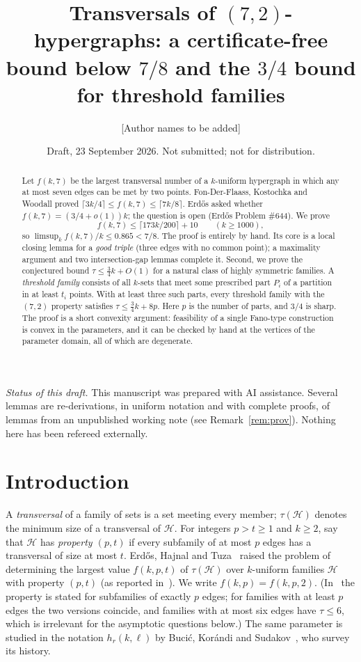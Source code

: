 \documentclass[11pt]{amsart}
\title[Transversals of $(7,2)$-hypergraphs]{Transversals of $(7,2)$-hypergraphs: a certificate-free bound below $7/8$ and the $3/4$ bound for threshold families}
\author{[Author names to be added]}
\date{Draft, 23 September 2026. Not submitted; not for distribution.}
\theoremstyle{definition}
\theoremstyle{remark}
\newcommand{\cH}{\mathcal H}
\newcommand{\ceil}[1]{\lceil #1\rceil}
\begin{document}
\begin{abstract}
Let $f(k,7)$ be the largest transversal number of a $k$-uniform hypergraph in which any at most seven edges can be met by two points. Fon-Der-Flaass, Kostochka and Woodall proved $\ceil{3k/4}\le f(k,7)\le\ceil{7k/8}$. Erd\H{o}s asked whether $f(k,7)=(3/4+o(1))k$; the question is open (Erd\H{o}s Problem \#644). We prove
\[
f(k,7)\le\ceil{173k/200}+10\qquad(k\ge1000),
\]
so $\limsup_k f(k,7)/k\le 0.865<7/8$. The proof is entirely by hand. Its core is a local closing lemma for a \emph{good triple} (three edges with no common point); a maximality argument and two intersection-gap lemmas complete it.
Second, we prove the conjectured bound $\tau\le\frac34k+O(1)$ for a natural class of highly symmetric families. A \emph{threshold family} consists of all $k$-sets that meet some prescribed part $P_i$ of a partition in at least $t_i$ points. With at least three such parts, every threshold family with the $(7,2)$ property satisfies $\tau\le\frac34k+8p$. Here $p$ is the number of parts, and $3/4$ is sharp. The proof is a short convexity argument: feasibility of a single Fano-type construction is convex in the parameters, and it can be checked by hand at the vertices of the parameter domain, all of which are degenerate.
\end{abstract}
\maketitle

\noindent\textit{Status of this draft.} This manuscript was prepared with AI assistance. Several lemmas are re-derivations, in uniform notation and with complete proofs, of lemmas from an unpublished working note (see Remark~\ref{rem:prov}). Nothing here has been refereed externally.

\section{Introduction}

A \emph{transversal} of a family of sets is a set meeting every member; $\tau(\cH)$ denotes the minimum size of a transversal of $\cH$. For integers $p>t\ge1$ and $k\ge2$, say that $\cH$ has \emph{property $(p,t)$} if every subfamily of at most $p$ edges has a transversal of size at most $t$. Erd\H{o}s, Hajnal and Tuza~\cite{EHT} raised the problem of determining the largest value $f(k,p,t)$ of $\tau(\cH)$ over $k$-uniform families $\cH$ with property $(p,t)$ (as reported in~\cite{FKW}). We write $f(k,p)=f(k,p,2)$. (In~\cite{FKW} the property is stated for subfamilies of exactly $p$ edges; for families with at least $p$ edges the two versions coincide, and families with at most six edges have $\tau\le6$, which is irrelevant for the asymptotic questions below.) The same parameter is studied in the notation $h_r(k,\ell)$ by Buci\'c, Kor\'andi and Sudakov~\cite{BKS}, who survey its history.
\end{document}
